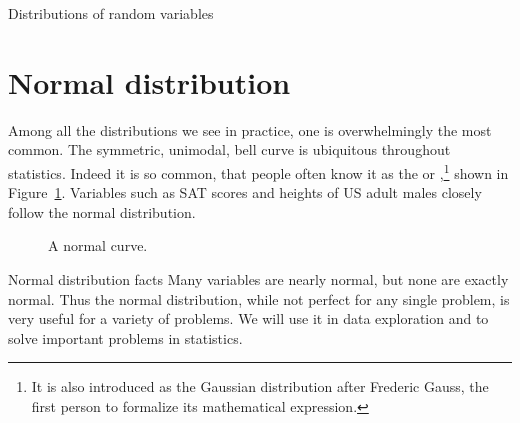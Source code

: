 \begin{chapterpage}{Distributions of random variables}
  \label{ch_distributions}
\end{chapterpage}
\renewcommand{\chapterfolder}{ch_distributions}



\section{Normal distribution}
\label{normalDist}


Among all the distributions we see in practice,
one is overwhelmingly the most common.
The symmetric, unimodal, bell curve is ubiquitous
throughout statistics.
Indeed it is so common, that people often know it as the
 or
%
,\footnote{It
  is also introduced as the Gaussian distribution after Frederic
  Gauss, the first person to formalize its mathematical
  expression.}
shown in Figure~\ref{simpleNormal}.
Variables such as SAT scores and heights of US adult males
closely follow the normal distribution.

\begin{figure}[h]
  \centering
  \caption{A normal curve.}
  \label{simpleNormal}
\end{figure}

\begin{onebox}{Normal distribution facts}
  Many variables are nearly normal, but none are exactly normal.
  Thus the normal distribution, while not perfect for any single
  problem, is very useful for a variety of problems.
  We will use it in data exploration and to solve important
  problems in statistics.
\end{onebox}


